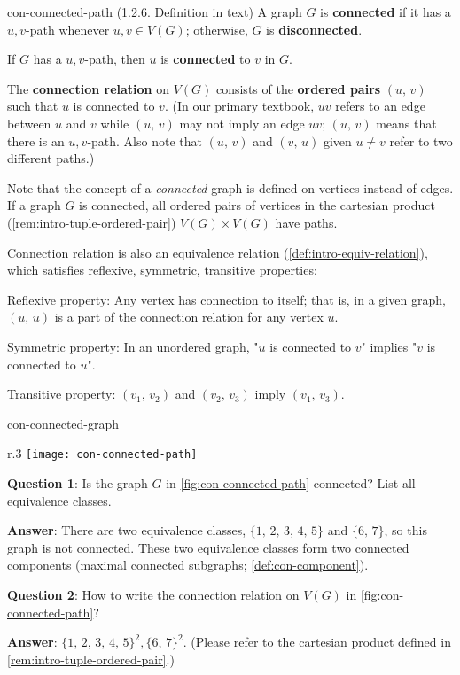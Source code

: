 \documentclass[../src/handouts/main.tex]{subfiles}
\begin{document}
\begin{definition}{}{con-connected-path}
  (1.2.6. Definition in text)
  A graph $G$ is \textbf{connected} if it has a $u,v$-path whenever $u,v \in V(G)$; otherwise, $G$ is \textbf{disconnected}.

  If $G$ has a $u,v$-path, then $u$ is \textbf{connected} to $v$ in $G$.

  The \textbf{connection relation} on $V(G)$ consists of the \textbf{ordered pairs} $(u,\, v)$ such that $u$ is connected to $v$. (In our primary textbook, $uv$ refers to an edge between $u$ and $v$ while $(u,\, v)$ may not imply an edge $uv$; $(u,\, v)$ means that there is an $u,v$-path. Also note that $(u,\, v)$ and $(v,\, u)$ given $u \neq v$ refer to two different paths.)
\end{definition}

Note that the concept of a \textit{connected} graph is defined on vertices instead of edges. If a graph $G$ is connected, all ordered pairs of vertices in the cartesian product (\cref{rem:intro-tuple-ordered-pair}) $V(G) \times V(G)$ have paths.

Connection relation is also an equivalence relation (\cref{def:intro-equiv-relation}), which satisfies reflexive, symmetric, transitive properties:
\begin{enumerate*}
  \item Reflexive property: Any vertex has connection to itself; that is, in a given graph, $(u,\, u)$ is a part of the connection relation for any vertex $u$.
  \item Symmetric property: In an unordered graph, "$u$ is connected to $v$" implies "$v$ is connected to $u$".
  \item Transitive property: $(v_1,\, v_2)$ and $(v_2,\, v_3)$ imply $(v_1,\, v_3)$.
\end{enumerate*}

\begin{example}{}{con-connected-graph}
  \begin{wrapfigure}{r}{.3\textwidth}
    \centering
    \texttt{[image: con-connected-path]}
    \caption{A graph $G$ to illustrate connection relation.}
    \label{fig:con-connected-path}
  \end{wrapfigure}

  \textbf{Question 1}: Is the graph $G$ in \cref{fig:con-connected-path} connected? List all equivalence classes.

  \textbf{Answer}: There are two equivalence classes, $\{1,\, 2,\, 3,\, 4,\, 5\}$ and $\{6,\, 7\}$, so this graph is not connected. These two equivalence classes form two connected components (maximal connected subgraphs; \cref{def:con-component}).

  \textbf{Question 2}: How to write the connection relation on $V(G)$ in \cref{fig:con-connected-path}?

  \textbf{Answer}: $\{ 1,\, 2,\, 3,\, 4,\, 5 \}^2, \{ 6,\, 7 \}^2$. (Please refer to the cartesian product defined in \cref{rem:intro-tuple-ordered-pair}.)
\end{example}
\end{document}

